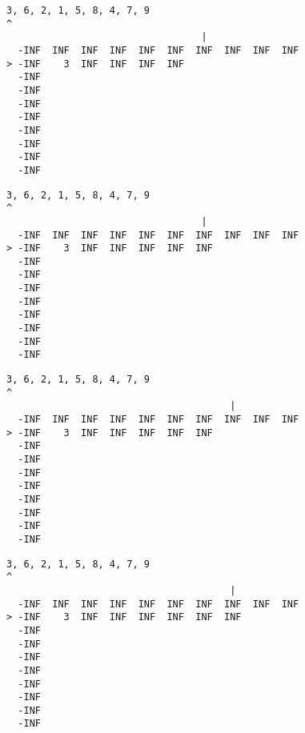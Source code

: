 { \begin{verbatim}
3, 6, 2, 1, 5, 8, 4, 7, 9
^
                                  |
  -INF  INF  INF  INF  INF  INF  INF  INF  INF  INF
> -INF    3  INF  INF  INF  INF                    
  -INF                                             
  -INF                                             
  -INF                                             
  -INF                                             
  -INF                                             
  -INF                                             
  -INF                                             
  -INF                                             
\end{verbatim} }

{ \begin{verbatim}
3, 6, 2, 1, 5, 8, 4, 7, 9
^
                                  |
  -INF  INF  INF  INF  INF  INF  INF  INF  INF  INF
> -INF    3  INF  INF  INF  INF  INF               
  -INF                                             
  -INF                                             
  -INF                                             
  -INF                                             
  -INF                                             
  -INF                                             
  -INF                                             
  -INF                                             
\end{verbatim} }

{ \begin{verbatim}
3, 6, 2, 1, 5, 8, 4, 7, 9
^
                                       |
  -INF  INF  INF  INF  INF  INF  INF  INF  INF  INF
> -INF    3  INF  INF  INF  INF  INF               
  -INF                                             
  -INF                                             
  -INF                                             
  -INF                                             
  -INF                                             
  -INF                                             
  -INF                                             
  -INF                                             
\end{verbatim} }

{ \begin{verbatim}
3, 6, 2, 1, 5, 8, 4, 7, 9
^
                                       |
  -INF  INF  INF  INF  INF  INF  INF  INF  INF  INF
> -INF    3  INF  INF  INF  INF  INF  INF          
  -INF                                             
  -INF                                             
  -INF                                             
  -INF                                             
  -INF                                             
  -INF                                             
  -INF                                             
  -INF                                             
\end{verbatim} }

